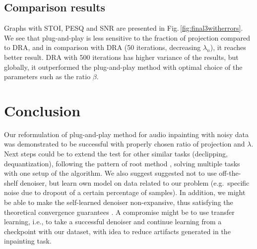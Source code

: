 \documentclass[conference]{IEEEtran}
\begin{document}
\subsection{Comparison results}


Graphs with STOI, PESQ and SNR are presented in Fig.\,\ref{fig:final3witherrors}.
We see that plug-and-play is less sensitive to the fraction of projection compared to DRA,
and in comparison with DRA (50 iterations, decreasing $\lambda_n$), it reaches better result.
DRA with 500 iterations has higher variance of the results, but globally, it outperformed the plug-and-play method with optimal choice of the parameters such as the ratio $\beta$.




\section{Conclusion}
\label{sec:conclusion}

Our reformulation of plug-and-play method for audio inpainting with noisy data was demonstrated to be successful with properly chosen ratio of projection and $\lambda$.
Next steps could be to extend the test for other similar tasks (declipping, dequantization), following the pattern of root method \cite{Chan2016}, solving multiple tasks with one setup of the algorithm.
We also suggest suggested not to use off-the-shelf denoiser, but learn own model on data related to our problem (e.g.\ specific noise due to dropout of a certain percentage of samples).
In addition,
we might be able to make the self-learned denoiser non-expansive, thus satisfying the theoretical convergence guarantees \cite{Venkatakrishnan2013,Chan2016}.
A compromise might be to use transfer learning,
i.e., to take a successful denoiser and continue learning from a checkpoint with our dataset,
with idea to reduce artifacts generated in the inpainting task.




\end{document}
